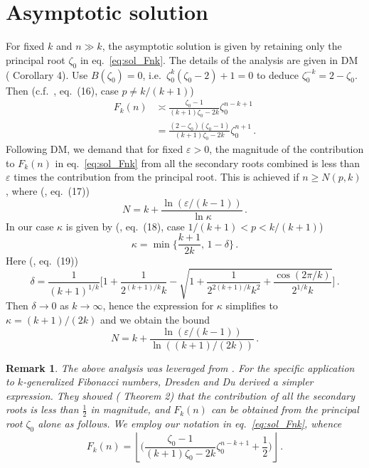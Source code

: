\documentclass[review]{elsarticle}
\theoremstyle{plain}
\newtheorem{remark}[theorem]{Remark}
\begin{document}
\section{Asymptotic solution}\label{sec:asymp}
For fixed $k$ and $n\gg k$, the asymptotic solution is given by retaining only
the principal root $\zeta_0$ in eq.~\eqref{eq:sol_Fnk}.
The details of the analysis are given in DM (\cite{DM3} Corollary 4).
Use $B(\zeta_0)=0$, i.e.~$\zeta_0^k(\zeta_0-2)+1=0$ to deduce $\zeta_0^{-k} = 2-\zeta_0$.
Then (c.f.~\cite{DM3}, eq.~(16), case $p\ne k/(k+1)$)
\begin{equation}
\begin{split}
F_k(n) &\asymp \frac{\zeta_0-1}{(k+1)\zeta_0-2k} \zeta_0^{n-k+1}
\\
&= \frac{(2-\zeta_0)(\zeta_0-1)}{(k+1)\zeta_0-2k} \zeta_0^{n+1} \,.
\end{split}
\end{equation}
Following DM, we demand that for fixed $\varepsilon>0$,
the magnitude of the contribution to $F_k(n)$ in eq.~\eqref{eq:sol_Fnk}
from all the secondary roots combined
is less than $\varepsilon$ times the contribution from the principal root.
This is achieved if $n\ge N(p,k)$, where (\cite{DM3}, eq.~(17))
\begin{equation}
N = k +\frac{\ln(\varepsilon/(k-1))}{\ln\kappa} \,.
\end{equation}
In our case $\kappa$ is given by (\cite{DM3}, eq.~(18), case $1/(k+1) < p < k/(k+1)$)
\begin{equation}
\kappa = \min\biggl\{\frac{k+1}{2k},\, 1-\delta\biggr\} \,.
\end{equation}
Here (\cite{DM3}, eq.~(19))
\begin{equation}
\delta = \frac{1}{(k+1)^{1/k}}\biggl[ 1 + \frac{1}{2^{(k+1)/k}k} -\sqrt{1+\frac{1}{2^{2(k+1)/k}k^2} +\frac{\cos(2\pi/k)}{2^{1/k}k} }\biggr] \,.
\end{equation}
Then $\delta\to0$ as $k\to\infty$, hence the expression for $\kappa$ simplifies to $\kappa=(k+1)/(2k)$ 
and we obtain the bound
\begin{equation}
N = k +\frac{\ln(\varepsilon/(k-1))}{\ln((k+1)/(2k))} \,.
\end{equation}
\begin{remark}
The above analysis was leveraged from \cite{DM3}.
For the specific application to $k$-generalized Fibonacci numbers, Dresden and Du \cite{DresdenDu} derived a simpler expression.
They showed (\cite{DresdenDu} Theorem 2) that the contribution of all the secondary roots is less than $\frac12$ in magnitude,
and $F_k(n)$ can be obtained from the principal root $\zeta_0$ alone as follows.
We employ our notation in eq.~\eqref{eq:sol_Fnk}, whence
\begin{equation}
\label{eq:Fnk_prin_rnd}
F_k(n) = \left\lfloor \biggl(\frac{\zeta_0-1}{(k+1)\zeta_0-2k} \zeta_0^{n-k+1} +\frac12\biggr) \right\rfloor \,.
\end{equation}
\end{remark}
\end{document}
